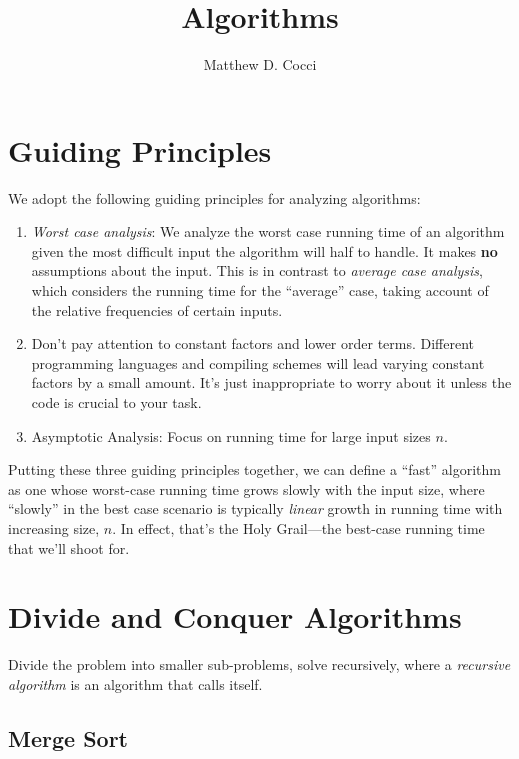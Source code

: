 \documentclass[a4paper,12pt]{scrartcl}
\author{Matthew D. Cocci}
\title{Algorithms}
\date{}
\begin{document}
\maketitle


\section{Guiding Principles}

We adopt the following guiding principles for analyzing
algorithms:
\begin{enumerate}
    \item \emph{Worst case analysis}: We analyze the worst
	case running time of an algorithm given the most
	difficult input the algorithm will half to handle. 
	It makes \textbf{no} assumptions about the input.
	This is in contrast to \emph{average case analysis},
	which considers the running time for the ``average''
	case, taking account of the relative frequencies of 
	certain inputs.
    \item Don't pay attention to constant factors and
	lower order terms. Different programming languages
	and compiling schemes will lead varying constant
	factors by a small amount. It's just inappropriate
	to worry about it unless the code is crucial to
	your task.
    \item Asymptotic Analysis: Focus on running time for 
	large input sizes $n$.
\end{enumerate}
Putting these three guiding principles together, we can
define a ``fast'' algorithm as one whose worst-case 
running time grows slowly with the input size,
where ``slowly'' in the best case scenario is typically
\emph{linear} growth in running time with increasing size, $n$.
In effect, that's the Holy Grail---the best-case running time
that we'll shoot for.


\section{Divide and Conquer Algorithms}

Divide the problem into smaller sub-problems, solve recursively,
where a \emph{recursive algorithm} is an algorithm that calls itself.


\subsection{Merge Sort}
\end{document}
